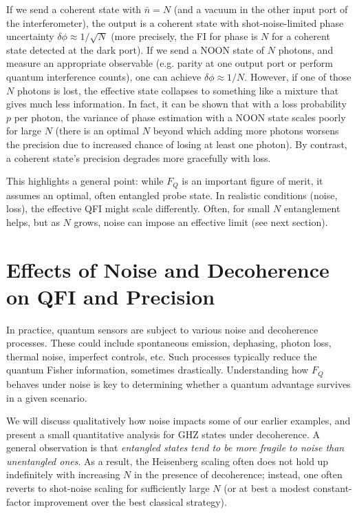 If we send a coherent state with $\bar{n}=N$ (and a vacuum in the
other input port of the interferometer), the output is a coherent
state with shot-noise-limited phase uncertainty $\delta \phi \approx
1/\sqrt{N}$ (more precisely, the FI for phase is $N$ for a coherent
state detected at the dark port).  If we send a NOON state of $N$
photons, and measure an appropriate observable (e.g. parity at one
output port or perform quantum interference counts), one can achieve
$\delta \phi \approx 1/N$. However, if one of those $N$ photons is
lost, the effective state collapses to something like a mixture that
gives much less information. In fact, it can be shown that with a loss
probability $p$ per photon, the variance of phase estimation with a
NOON state scales poorly for large $N$ (there is an optimal $N$ beyond
which adding more photons worsens the precision due to increased
chance of losing at least one photon). By contrast, a coherent state’s
precision degrades more gracefully with loss.




This highlights a general point: while $F_Q$ is an important figure of
merit, it assumes an optimal, often entangled probe state. In
realistic conditions (noise, loss), the effective QFI might scale
differently. Often, for small $N$ entanglement helps, but as $N$
grows, noise can impose an effective limit (see next section).



\section{Effects of Noise and Decoherence on QFI and Precision}

\label{sec:noise}



In practice, quantum sensors are subject to various noise and
decoherence processes. These could include spontaneous emission,
dephasing, photon loss, thermal noise, imperfect controls, etc. Such
processes typically reduce the quantum Fisher information, sometimes
drastically. Understanding how $F_Q$ behaves under noise is key to
determining whether a quantum advantage survives in a given scenario.



We will discuss qualitatively how noise impacts some of our earlier
examples, and present a small quantitative analysis for GHZ states
under decoherence. A general observation is that \emph{entangled
states tend to be more fragile to noise than unentangled ones}. As a
result, the Heisenberg scaling often does not hold up indefinitely
with increasing $N$ in the presence of decoherence; instead, one often
reverts to shot-noise scaling for sufficiently large $N$ (or at best a
modest constant-factor improvement over the best classical strategy).



